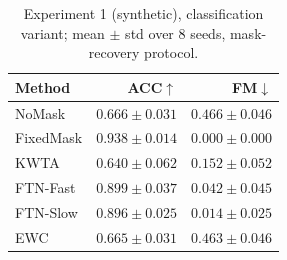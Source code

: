 \begin{table}[t]
\caption{Experiment 1 (synthetic), classification variant; mean $\pm$ std over 8 seeds, mask-recovery protocol.}
\label{tab:exp1clf}
\vskip 0.05in
\begin{center}\begin{small}\begin{sc}
\begin{tabular}{lrr}
\toprule
Method & ACC$\uparrow$ & FM$\downarrow$ \\
\midrule
NoMask & $0.666\pm0.031$ & $0.466\pm0.046$ \\
FixedMask & $0.938\pm0.014$ & $0.000\pm0.000$ \\
KWTA & $0.640\pm0.062$ & $0.152\pm0.052$ \\
FTN-Fast & $0.899\pm0.037$ & $0.042\pm0.045$ \\
FTN-Slow & $0.896\pm0.025$ & $0.014\pm0.025$ \\
EWC & $0.665\pm0.031$ & $0.463\pm0.046$ \\
\bottomrule
\end{tabular}
\end{sc}\end{small}\end{center}
\vskip -0.1in
\end{table}
